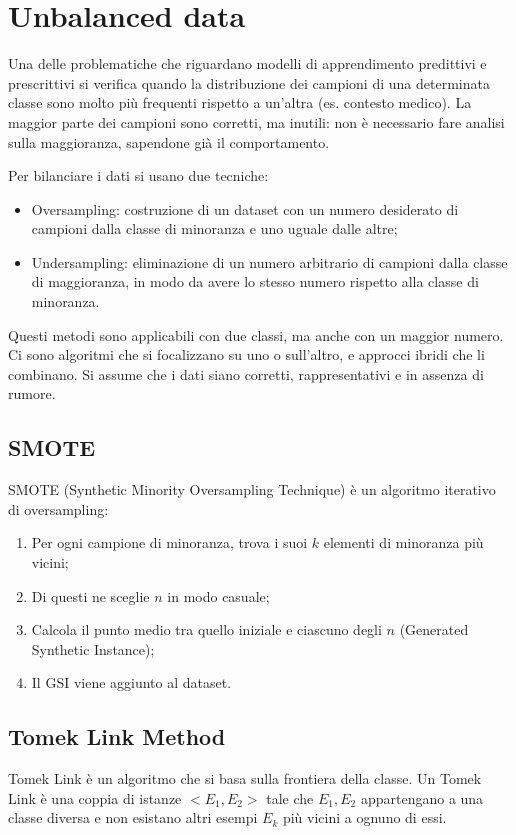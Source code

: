 \section{Unbalanced data}
Una delle problematiche che riguardano modelli di apprendimento predittivi e prescrittivi si verifica quando la distribuzione dei campioni di una determinata classe sono molto più frequenti rispetto a un'altra (es. contesto medico). La maggior parte dei campioni sono corretti, ma inutili: non è necessario fare analisi sulla maggioranza, sapendone già il comportamento. 

Per bilanciare i dati si usano due tecniche:
\begin{itemize}
	\item Oversampling: costruzione di un dataset con un numero desiderato di campioni dalla classe di minoranza e uno uguale dalle altre;
	\item Undersampling: eliminazione di un numero arbitrario di campioni dalla classe di maggioranza, in modo da avere lo stesso numero rispetto alla classe di minoranza. 
\end{itemize}
Questi metodi sono applicabili con due classi, ma anche con un maggior numero. Ci sono algoritmi che si focalizzano su uno o sull'altro, e approcci ibridi che li combinano. Si assume che i dati siano corretti, rappresentativi e in assenza di rumore.

\subsection{SMOTE}
SMOTE (Synthetic Minority Oversampling Technique) è un algoritmo iterativo di oversampling:
\begin{enumerate}
	\item Per ogni campione di minoranza, trova i suoi $k$ elementi di minoranza più vicini;
	\item Di questi ne sceglie $n$ in modo casuale;
	\item Calcola il punto medio tra quello iniziale e ciascuno degli $n$ (Generated Synthetic Instance);
	\item Il GSI viene aggiunto al dataset.
\end{enumerate}

\subsection{Tomek Link Method}
Tomek Link è un algoritmo che si basa sulla frontiera della classe. Un Tomek Link è una coppia di istanze $<E_1, E_2>$ tale che $E_1, E_2$ appartengano a una classe diversa e non esistano altri esempi $E_k$ più vicini a ognuno di essi.

